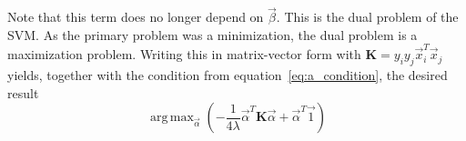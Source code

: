 \documentclass[a4paper]{article}
\DeclareMathOperator*{\argmax}{arg\,max}
\newcommand{\matr}[1]{\mathbf{#1}}
\begin{document}
Note that this term does no longer depend on $\vec{\beta}$. This is the dual
problem of the SVM\@. As the primary problem was a minimization, the dual problem
is a maximization problem. Writing this in matrix-vector form with
$\matr{K}=y_iy_j\vec{x}_i^T\vec{x}_j$ yields, together with the condition from
equation~\ref{eq:a_condition}, the desired result
\begin{equation*}
    \argmax_{\vec{\alpha}}\left(
        - \frac{1}{4\lambda}\vec{\alpha}^T\matr{K}\vec{\alpha}
        + \vec{\alpha}^T\vec{1}
    \right)
\end{equation*}
\end{document}
